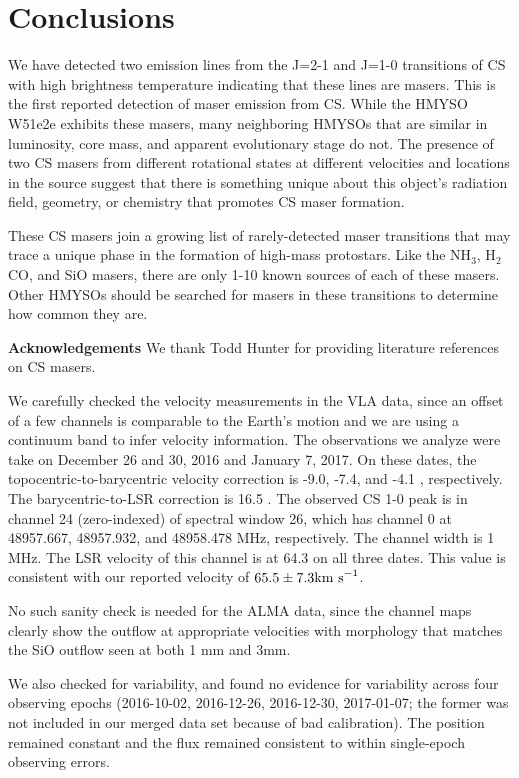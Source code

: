 \documentclass[twocolumn]{aastex62}
\begin{document}
\section{Conclusions}
We have detected two emission lines from the J=2-1 and J=1-0 transitions of CS
with high brightness temperature indicating that these lines are masers.
This is the first reported detection of maser emission from CS.
While the HMYSO W51e2e exhibits these masers, many neighboring HMYSOs that
are similar in luminosity, core mass, and apparent evolutionary stage
do not.  The presence of two CS masers from different rotational states
at different velocities and locations in the source suggest that there is something
unique about this object's radiation field, geometry, or chemistry that
promotes CS maser formation.

These CS masers join a growing list of rarely-detected maser transitions
that may trace a unique phase in the formation of high-mass protostars.
Like the NH$_3$, H$_2$CO, and SiO masers, there are only 1-10 known sources of
each of these masers.  Other HMYSOs should be searched for masers in these
transitions to determine how common they are.

\textbf{Acknowledgements}
We thank Todd Hunter for providing literature references on CS masers.

We carefully checked the velocity measurements in the VLA data, since
an offset of a few channels is comparable to the Earth's motion
and we are using a continuum band to infer velocity information.
The observations we analyze were take on December 26 and 30, 2016
and January 7, 2017.  On these dates, the topocentric-to-barycentric
velocity correction is -9.0, -7.4, and -4.1 \kms, respectively.
The barycentric-to-LSR correction is 16.5 \kms.
The observed CS 1-0 peak is in channel 24 (zero-indexed) of
spectral window 26, which has channel 0 at  48957.667, 48957.932, and 48958.478
MHz, respectively.  The channel width is 1 MHz.  The LSR velocity of this
channel is at 64.3 \kms on all three dates.  This value is consistent
with our reported velocity of $65.5 \pm 7.3 \textrm{km~s}^{-1}$.

No such sanity check is needed for the ALMA data, since the channel maps clearly
show the outflow at appropriate velocities with morphology that matches the SiO
outflow seen at both 1 mm and 3mm.

We also checked for variability, and found no evidence for variability
across four observing epochs (2016-10-02, 2016-12-26, 2016-12-30, 2017-01-07; the
former was not included in our merged data set because of bad calibration).
The position remained constant and the flux remained consistent to within single-epoch
observing errors.


\end{document}
